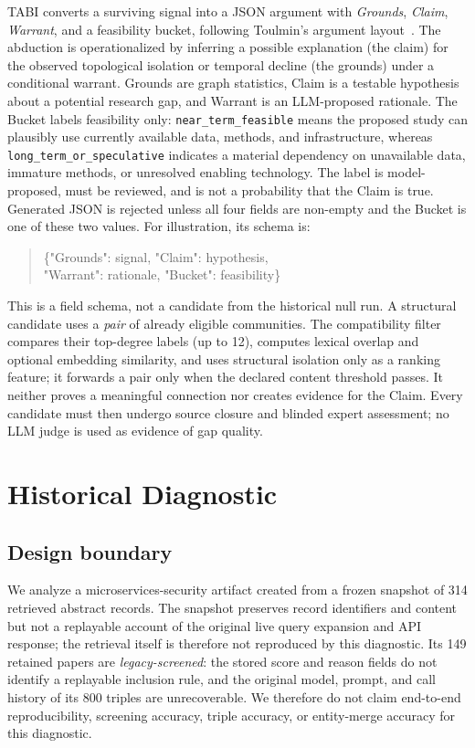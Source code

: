 \documentclass[runningheads]{llncs}
\begin{document}
TABI converts a surviving signal into a JSON argument with \emph{Grounds}, \emph{Claim}, \emph{Warrant}, and a feasibility bucket, following Toulmin's argument layout~\cite{toulmin1958uses}. The abduction is operationalized by inferring a possible explanation (the claim) for the observed topological isolation or temporal decline (the grounds) under a conditional warrant. Grounds are graph statistics, Claim is a testable hypothesis about a potential research gap, and Warrant is an LLM-proposed rationale. The Bucket labels feasibility only: \texttt{near\_term\_feasible} means the proposed study can plausibly use currently available data, methods, and infrastructure, whereas \texttt{long\_term\_or\_speculative} indicates a material dependency on unavailable data, immature methods, or unresolved enabling technology. The label is model-proposed, must be reviewed, and is not a probability that the Claim is true. Generated JSON is rejected unless all four fields are non-empty and the Bucket is one of these two values. For illustration, its schema is:
\begin{quote}\small\ttfamily
\{"Grounds": signal, "Claim": hypothesis,\\
"Warrant": rationale, "Bucket": feasibility\}
\end{quote}
This is a field schema, not a candidate from the historical null run. A structural candidate uses a \emph{pair} of already eligible communities. The compatibility filter compares their top-degree labels (up to 12), computes lexical overlap and optional embedding similarity, and uses structural isolation only as a ranking feature; it forwards a pair only when the declared content threshold passes. It neither proves a meaningful connection nor creates evidence for the Claim. Every candidate must then undergo source closure and blinded expert assessment; no LLM judge is used as evidence of gap quality.

\section{Historical Diagnostic}
\subsection{Design boundary}
We analyze a microservices-security artifact created from a frozen snapshot of 314 retrieved abstract records. The snapshot preserves record identifiers and content but not a replayable account of the original live query expansion and API response; the retrieval itself is therefore not reproduced by this diagnostic. Its 149 retained papers are \emph{legacy-screened}: the stored score and reason fields do not identify a replayable inclusion rule, and the original model, prompt, and call history of its 800 triples are unrecoverable. We therefore do not claim end-to-end reproducibility, screening accuracy, triple accuracy, or entity-merge accuracy for this diagnostic.
\end{document}
